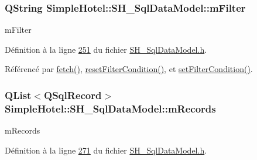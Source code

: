 \hypertarget{classSimpleHotel_1_1SH__SqlDataModel_a597b97e579df9747a3844fa3e72dcf08}{
\subsubsection[{m\-Filter}]{\setlength{\rightskip}{0pt plus 5cm}Q\-String Simple\-Hotel\-::\-S\-H\-\_\-\-Sql\-Data\-Model\-::m\-Filter\hspace{0.3cm}{\ttfamily [private]}}}\label{classSimpleHotel_1_1SH__SqlDataModel_a597b97e579df9747a3844fa3e72dcf08}


m\-Filter 



Définition à la ligne \hyperlink{SH__SqlDataModel_8h_source_l00251}{251} du fichier \hyperlink{SH__SqlDataModel_8h_source}{S\-H\-\_\-\-Sql\-Data\-Model.\-h}.



Référencé par \hyperlink{classSimpleHotel_1_1SH__SqlDataModel_ab8b74a08f668025c11c5446d4e4b469b}{fetch()}, \hyperlink{classSimpleHotel_1_1SH__SqlDataModel_a50db9acfb9b111f76c020468f14cb86c}{reset\-Filter\-Condition()}, et \hyperlink{classSimpleHotel_1_1SH__SqlDataModel_ad28581e259f10824eb652c08c092fe58}{set\-Filter\-Condition()}.

\hypertarget{classSimpleHotel_1_1SH__SqlDataModel_af73abbb951de936944285571f34407c5}{
\subsubsection[{m\-Records}]{\setlength{\rightskip}{0pt plus 5cm}Q\-List$<$Q\-Sql\-Record$>$ Simple\-Hotel\-::\-S\-H\-\_\-\-Sql\-Data\-Model\-::m\-Records\hspace{0.3cm}{\ttfamily [private]}}}\label{classSimpleHotel_1_1SH__SqlDataModel_af73abbb951de936944285571f34407c5}


m\-Records 



Définition à la ligne \hyperlink{SH__SqlDataModel_8h_source_l00271}{271} du fichier \hyperlink{SH__SqlDataModel_8h_source}{S\-H\-\_\-\-Sql\-Data\-Model.\-h}.



